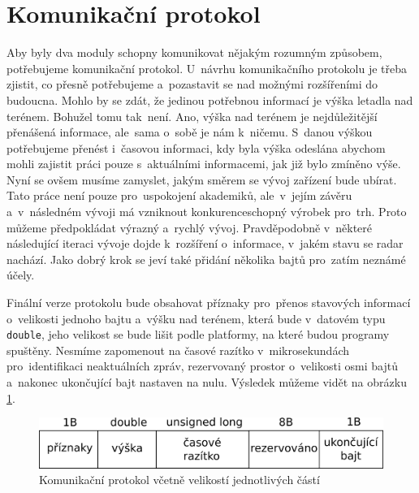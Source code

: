 	\section{Komunikační protokol}\label{navrhReseni::protokol}	
		Aby byly dva moduly schopny komunikovat nějakým rozumným způsobem, potřebujeme komunikační protokol.
		U~návrhu komunikačního protokolu je třeba zjistit, co přesně potřebujeme a~pozastavit se nad možnými rozšířeními do budoucna. Mohlo by se zdát, že jedinou potřebnou informací je výška letadla nad terénem. Bohužel tomu tak~není. Ano, výška nad terénem je nejdůležitější přenášená informace, ale~sama o~sobě je nám k~ničemu. S~danou výškou potřebujeme přenést i~časovou informaci, kdy byla výška odeslána abychom mohli zajistit práci pouze s~aktuálními informacemi, jak již bylo zmíněno výše. Nyní se ovšem musíme zamyslet, jakým směrem se vývoj zařízení bude ubírat. Tato práce není pouze pro~uspokojení akademiků, ale~v~jejím závěru a~v~následném vývoji má vzniknout konkurenceschopný výrobek pro~trh. Proto můžeme předpokládat výrazný a~rychlý vývoj. Pravděpodobně v~některé následující iteraci vývoje dojde k~rozšíření o~informace, v~jakém stavu se radar nachází. Jako dobrý krok se jeví také přidání několika bajtů pro~zatím neznámé účely.\par
		Finální verze protokolu bude obsahovat příznaky pro~přenos stavových informací o~velikosti jednoho bajtu a~výšku nad terénem, která bude v~datovém typu \texttt{double}, jeho velikost se bude lišit podle platformy, na které budou programy spuštěny. Nesmíme zapomenout na časové razítko v~mikrosekundách pro~identifikaci neaktuálních zpráv, rezervovaný prostor o~velikosti osmi bajtů a~nakonec ukončující bajt nastaven na nulu. Výsledek můžeme vidět na obrázku \ref{navrh::protokol}.
		
		\begin{figure}[H]
			\begin{center}
				\includegraphics[scale=0.7]{obrazky-figures/protokol.png}
				\caption{Komunikační protokol včetně velikostí jednotlivých částí}
				\label{navrh::protokol}
			\end{center}
		\end{figure}
		

		
		
